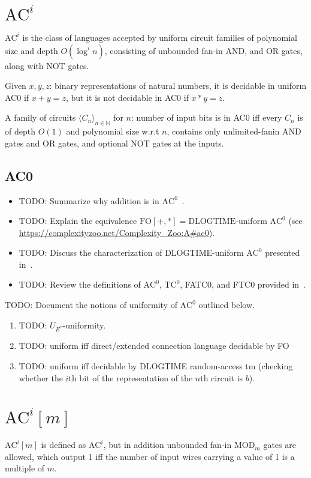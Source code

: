 \section{\texorpdfstring{$\text{AC}^i$}{AC\string^i}}
$\text{AC}^i$ is the class of languages accepted by uniform circuit
families of polynomial size and depth $O(\log^i n)$, consisting of unbounded fan-in
AND, and OR gates, along with NOT gates.

Given $x, y, z$: binary representations of natural numbers,
it is decidable in uniform AC0 if $x + y = z$, but it is not decidable 
in AC0 if $x * y = z$.

A family of circuits $\langle C_n \rangle_{n \in \mathbb{N}}$ for $n$:
number of input bits is in AC0 iff every $C_n$ is of depth $O(1)$ and polynomial 
size w.r.t $n$, contains only unlimited-fanin AND gates and OR gates, and optional 
NOT gates at the inputs. 

\subsection{AC0}
\begin{itemize}
\item TODO: Summarize why addition is in $\text{AC}^0$~\cite{BussLectureNotes}.
\item TODO: Explain the equivalence $\text{FO}[+, *] = \text{DLOGTIME}$-uniform $\text{AC}^0$ (see \url{https://complexityzoo.net/Complexity_Zoo:A#ac0}).
\item TODO: Discuss the characterization of DLOGTIME-uniform $\text{AC}^0$ presented in~\cite{hella2023regularrepresentationsuniformtc0}.
\item TODO: Review the definitions of $\text{AC}^0$, $\text{TC}^0$, FATC0, and FTC0 provided in~\cite{AGRAWAL2000395}.
\end{itemize}
TODO: Document the notions of uniformity of $\text{AC}^0$ outlined below.
\begin{enumerate}
\item TODO: $U_{E^*}$-uniformity.
\item TODO: uniform iff direct/extended connection language decidable by FO 
\item TODO: uniform iff decidable by DLOGTIME random-access tm (checking whether the $i$th bit of the representation of the $n$th circuit is $b$).
\end{enumerate}



\section{\texorpdfstring{$\text{AC}^i[m]$}{AC\string^i[m]}}
$\text{AC}^i[m]$ is defined as $\text{AC}^i$, but in addition unbounded fan-in $\text{MOD}_m$ gates
are allowed, which output 1 iff the number of input wires carrying a value of 1 is a
multiple of $m$.


